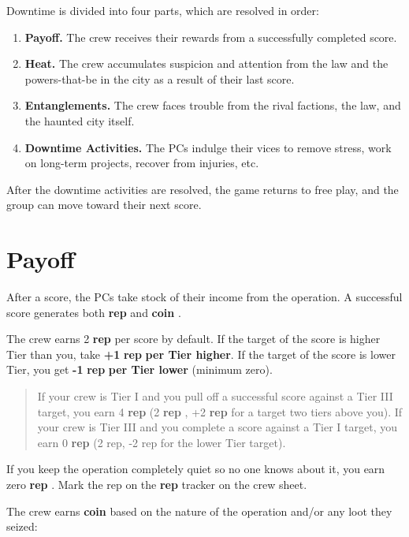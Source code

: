 \documentclass[11pt,fleqn,a5paper]{book}
\newcommand{\gameterm}[1]{\textbf{#1}}
\begin{document}
Downtime is divided into four parts, which are resolved in order:
\begin{enumerate}
	\item \gameterm{Payoff. } The crew receives their rewards from a successfully completed score.
	\item \gameterm{Heat. } The crew accumulates suspicion and attention from the law and the powers-that-be in the city as a result of their last score.
	\item \gameterm{Entanglements.}  The crew faces trouble from the rival factions, the law, and the haunted city itself.
	\item \gameterm{Downtime Activities.}  The PCs indulge their vices to remove stress, work on long-term projects, recover from injuries, etc.
\end{enumerate}

After the downtime activities are resolved, the game returns to free play, and the group can move toward their next score.

\chapter{Payoff}

After a score, the PCs take stock of their income from the operation. A successful score generates both \gameterm{rep}  and \gameterm{coin} .

The crew earns 2 \gameterm{rep}  per score by default. If the target of the score is higher Tier than you, take \textbf{+1 }\gameterm{rep} \textbf{ per Tier higher}. If the target of the score is lower Tier, you get \textbf{-1 }\gameterm{rep} \textbf{ per Tier lower} (minimum zero).

\begin{quote}
	If your crew is Tier I and you pull off a successful score against a Tier III target, you earn 4 \gameterm{rep}  (2 \gameterm{rep} , +2 \gameterm{rep}  for a target two tiers above you). If your crew is Tier III and you complete a score against a Tier I target, you earn 0 \gameterm{rep}  (2 rep, -2 rep for the lower Tier target).
\end{quote} 

If you keep the operation completely quiet so no one knows about it, you earn zero \gameterm{rep} . Mark the rep on the \gameterm{rep}  tracker on the crew sheet.

The crew earns \gameterm{coin}  based on the nature of the operation and/or any loot they seized:
\end{document}
